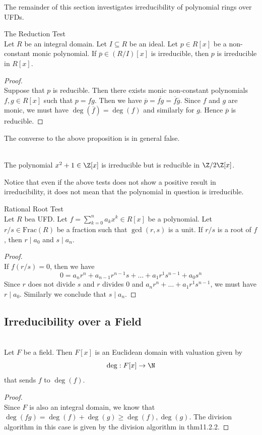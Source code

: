 \documentclass[a4paper]{article}
\begin{document}
The remainder of this section investigates irreducibility of polynomial rings over UFDs. 

\begin{prp}{The Reduction Test}{}\\
Let $R$ be an integral domain. Let $I\subseteq R$ be an ideal. Let $p\in R[x]$ be a non-constant monic polynomial. If $\overline{p}\in(R/I)[x]$ is irreducible, then $p$ is irreducible in $R[x]$. 
\begin{proof}\\
Suppose that $p$ is reducible. Then there exists monic non-constant polynomials $f,g\in R[x]$ such that $p=fg$. Then we have $\overline{p}=\overline{fg}=\overline{f}\overline{g}$. Since $f$ and $g$ are monic, we must have $\deg(\overline{f})=\deg(f)$ and similarly for $g$. Hence $\overline{p}$ is reducible. 
\end{proof}
\end{prp}

The converse to the above proposition is in general false. 

\begin{eg}{}{}\\
The polynomial $x^2+1\in\Z[x]$ is irreducible but is reducible in $\Z/2\Z[x]$. 
\end{eg}

Notice that even if the above tests does not show a positive result in irreducibility, it does not mean that the polynomial in question is irreducible. 

\begin{prp}{Rational Root Test}{}\\
Let $R$ bea UFD. Let $f=\sum_{k=0}^na_kx^k\in R[x]$ be a polynomial. Let $r/s\in\text{Frac}(R)$ be a fraction such that $\gcd(r,s)$ is a unit. If $r/s$ is a root of $f$, then $r\;|\;a_0$ and $s\;|\;a_n$. 
\begin{proof}\\
If $f(r/s)=0$, then we have $$0=a_nr^n+a_{n-1}r^{n-1}s+\dots+a_1r^1s^{n-1}+a_0s^n$$ Since $r$ does not divide $s$ and $r$ divides $0$ and $a_nr^n+\dots+a_1r^1s^{n-1}$, we must have $r\;|\;a_0$. Similarly we conclude that $s\;|\;a_n$. 
\end{proof}
\end{prp}

\subsection{Irreducibility over a Field}
\begin{prp}{}{}\\
Let $F$ be a field. Then $F[x]$ is an Euclidean domain with valuation given by $$\deg:F[x]\to\N$$ that sends $f$ to $\deg(f)$. 
\begin{proof}\\
Since $F$ is also an integral domain, we know that $\deg(fg)=\deg(f)+\deg(g)\geq\deg(f),\deg(g)$. The division algorithm in this case is given by the division algorithm in thm11.2.2. 
\end{proof}
\end{prp}
\end{document}
